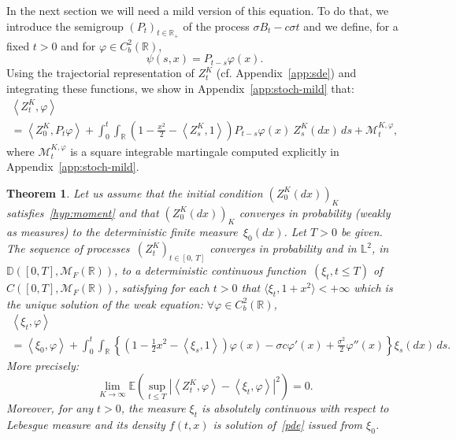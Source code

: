 \documentclass[10pt]{amsart}
\newtheorem{theo}{Theorem}[section]
\theoremstyle{definition}\newtheorem{defi}[theo]{Definition}\newtheorem{rema}[theo]{Remark}\newtheorem{exam}[theo]{Example}\newtheorem{exem}[theo]{Example}\newtheorem{nota}[theo]{Notation}
\newcommand{\Mo}{\mathcal{M}}
\newcommand*\D{\mathbb{D}}
\newcommand*\R{\mathbb{R}}
\newcommand*\E{\mathbb{E}}
\newcommand{\bbL}{\mathbb{L}}
\let\oldforall\forall
\renewcommand*{\forall}{\mathrel{\oldforall}}
\begin{document}
In the next section we will need a mild version of this equation. To do that, we introduce the semigroup $(P_{t})_{t \in \R_{+}}$ of the process $\sigma B_{t} - c \sigma t$ and we define, for a fixed $t>0$ and for $\varphi\in C^2_{b}(\R)$,
\begin{equation}\label{eq:semi-gp}
\psi(s,x) = P_{t-s}\varphi(x).
\end{equation}
Using the trajectorial representation of $Z^{K}_{t}$ (cf. Appendix~\ref{app:sde}) and integrating these functions, we show in Appendix~\ref{app:stoch-mild} that:
\begin{multline}\label{mild-proc}
\left\langle Z^{K}_{t},\varphi\right\rangle\\
=\left\langle Z^{K}_0,P_{t}\varphi\right\rangle+\int_{0}^{t} \int_{\R} \left(1-\frac{x^2}{2}-\left\langle Z^{K}_{s}, 1\right\rangle\right)P_{t-s}\varphi(x)\ Z^{K}_{s}(dx)\, ds+\Mo^{K, \varphi}_{t},
\end{multline}
where $\Mo^{K, \varphi}_{t}$ is a square integrable martingale computed explicitly in Appendix~\ref{app:stoch-mild}.


\begin{theo}\label{thm-CV}
Let us assume that the initial condition $(Z^K_0(dx))_{K}$ satisfies~\eqref{hyp:moment} and that $(Z^{K}_0(dx))_{K}$ converges in probability (weakly as measures) to the deterministic finite measure $\,\xi_0(dx)$. Let $T>0$ be given. The sequence of processes $\,(Z^{K}_{t})_{t \in [0,\,T]}$ converges in probability and in $\bbL^2$, in $\D([0,T],\Mo_{F}(\R))$, to a deterministic continuous function $\,(\xi_{t}, t\le T)$ of $C([0,T],\Mo_{F}(\R))$, satisfying for each $t>0$ that $\langle \xi_{t}, 1+x^2\rangle <+\infty$ which is the unique solution of the weak equation: $\forall \varphi\in C^2_{b}(\R)$,
\begin{multline}\label{limit-moving}
\left\langle \xi_{t},\varphi\right\rangle\\
=\left\langle \xi_{0},\varphi\right\rangle+\int_{0}^{t} \int_{\R} \left\{\left(1-\frac{1}{2}x^2-\left\langle \xi_{s}, 1\right\rangle\right)\varphi(x)-\sigma c \varphi'(x)+\frac{\sigma^2}{2}\varphi''(x)\right\} \xi_{s}(dx)\, ds.
\end{multline}
More precisely:
\begin{equation}\label{CV-L2}
\lim_{K \to \infty}\E\left(\sup_{t \le T} \left|\left\langle Z^{K}_{t},\varphi\right\rangle - \left\langle \xi_{t},\varphi\right\rangle\right|^2\right) = 0.
\end{equation}
Moreover, for any $t>0$, the measure $\xi_{t} $ is absolutely continuous with respect to Lebesgue measure and its density $f(t,x)$ is solution of~\eqref{pde} issued from $\xi_{0}$.
\end{theo}
\end{document}
